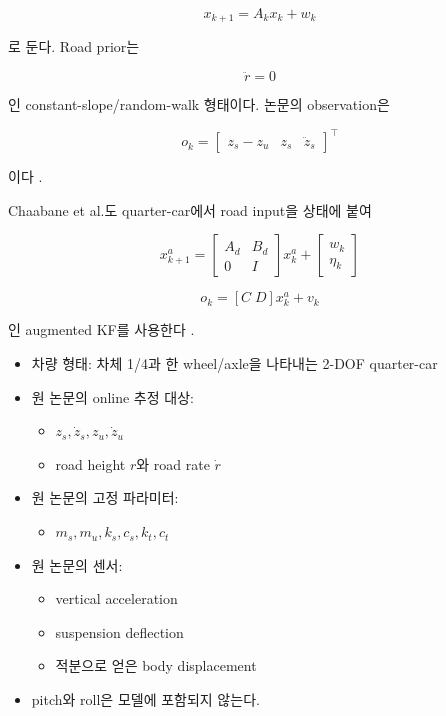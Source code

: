 \documentclass[letterpaper,10pt,journal,twocolumn]{ieeeconf}
\begin{document}
\[
x_{k+1}=A_kx_k+w_k
\]

로 둔다. Road prior는

\[
\ddot r=0
\]

인 constant-slope/random-walk 형태이다. 논문의 observation은

\[
o_k
=
\begin{bmatrix}
z_s-z_u&
z_s&
\ddot z_s
\end{bmatrix}^{\top}
\]

이다 \cite[eqs.~(1)--(4)]{doumiati2011}.

Chaabane et al.도 quarter-car에서 road input을 상태에 붙여

\[
x_{k+1}^{a}
=
\begin{bmatrix}
A_d&B_d\\
0&I
\end{bmatrix}
x_k^{a}
+
\begin{bmatrix}
w_k\\
\eta_k
\end{bmatrix}
\]

\[
o_k=[C\;D]x_k^a+v_k
\]

인 augmented KF를 사용한다 \cite[eq.~(3.5)]{chaabane2019}.

\begin{itemize}

\item
  차량 형태: 차체 1/4과 한 wheel/axle을 나타내는 2-DOF quarter-car
\item
  원 논문의 online 추정 대상:

  \begin{itemize}
  
  \item
    \(z_s,\dot z_s,z_u,\dot z_u\)
  \item
    road height \(r\)와 road rate \(\dot r\)
  \end{itemize}
\item
  원 논문의 고정 파라미터:

  \begin{itemize}
  
  \item
    \(m_s,m_u,k_s,c_s,k_t,c_t\)
  \end{itemize}
\item
  원 논문의 센서:

  \begin{itemize}
  
  \item
    vertical acceleration
  \item
    suspension deflection
  \item
    적분으로 얻은 body displacement
  \end{itemize}
\item
  pitch와 roll은 모델에 포함되지 않는다.
\end{itemize}
\end{document}
